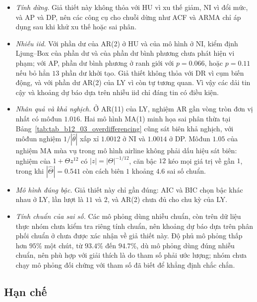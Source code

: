 \begin{itemize}[leftmargin=*,itemsep=2pt]
\item \emph{Tính dừng.} Giả thiết này không thỏa với HU vì xu thế giảm, NI vì đổi mức, và AP và DP, nên các công cụ cho chuỗi dừng như ACF và ARMA chỉ áp dụng sau khi khử xu thế hoặc sai phân.
\item \emph{Nhiễu iid.} Với phần dư của AR(2) ở HU và của mô hình ở NI, kiểm định Ljung--Box của phần dư và của phần dư bình phương chưa phát hiện vi phạm; với AP, phần dư bình phương ở ranh giới với $p=0.066$, hoặc $p=0.11$ nếu bỏ hẳn $13$ phần dư khởi tạo. Giả thiết không thỏa với DR vì cụm biến động, và với phần dư AR(2) của LY vì còn tự tương quan. Vì vậy các dải tin cậy và khoảng dự báo dựa trên nhiễu iid chỉ đáng tin có điều kiện.
\item \emph{Nhân quả và khả nghịch.} Ở AR(11) của LY, nghiệm AR gần vòng tròn đơn vị nhất có môđun $1.016$. Hai mô hình MA(1) minh họa sai phân thừa tại Bảng~\ref{tab:tab_b12_03_overdifferencing} cũng sát biên khả nghịch, với môđun nghiệm $1/|\hat\theta|$ xấp xỉ $1.0012$ ở NI và $1.0014$ ở DP. Môđun $1.05$ của nghiệm MA mùa vụ trong mô hình airline không phải dấu hiệu sát biên: nghiệm của $1+\Theta z^{12}$ có $|z|=|\Theta|^{-1/12}$, căn bậc $12$ kéo mọi giá trị về gần $1$, trong khi $|\hat\Theta|=0.541$ còn cách biên $1$ khoảng $4.6$ sai số chuẩn.
\item \emph{Mô hình đúng bậc.} Giả thiết này chỉ gần đúng: AIC và BIC chọn bậc khác nhau ở LY, lần lượt là $11$ và $2$, và AR(2) chưa đủ cho chu kỳ của LY.
\item \emph{Tính chuẩn của sai số.} Các mô phỏng dùng nhiễu chuẩn, còn trên dữ liệu thực nhóm chưa kiểm tra riêng tính chuẩn, nên khoảng dự báo dựa trên phân phối chuẩn ở  chưa được xác nhận về giả thiết này. Độ phủ mô phỏng thấp hơn $95\%$ một chút, từ $93.4\%$ đến $94.7\%$, dù mô phỏng dùng đúng nhiễu chuẩn, nên phù hợp với giải thích là do tham số phải ước lượng; nhóm chưa chạy mô phỏng đối chứng với tham số đã biết để khẳng định chắc chắn.
\end{itemize}

\subsection{Hạn chế}

